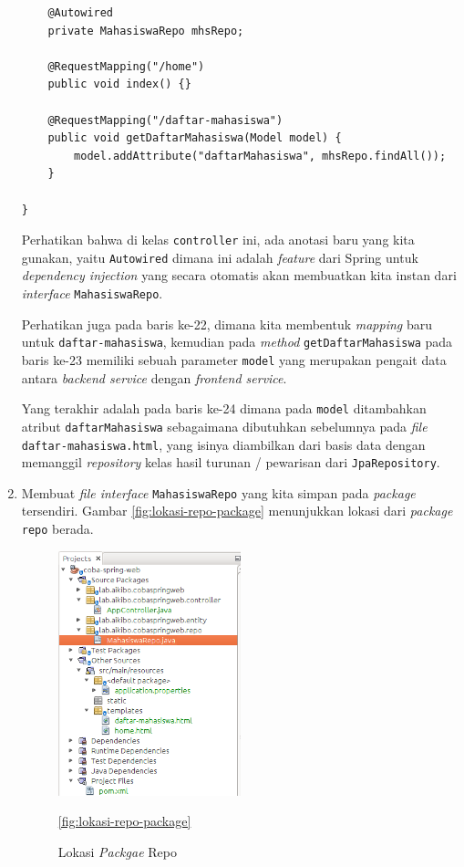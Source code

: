 \begin{enumerate}
\begin{lstlisting}
    @Autowired
    private MahasiswaRepo mhsRepo;
    
    @RequestMapping("/home")
    public void index() {}
    
    @RequestMapping("/daftar-mahasiswa") 
    public void getDaftarMahasiswa(Model model) {
        model.addAttribute("daftarMahasiswa", mhsRepo.findAll());
    }
    
}
	\end{lstlisting}
	
	Perhatikan bahwa di kelas \texttt{controller} ini, ada anotasi baru yang kita gunakan, yaitu \texttt{Autowired} dimana ini adalah \textit{feature} dari Spring untuk \textit{dependency injection} yang secara otomatis akan membuatkan kita instan dari \textit{interface} \texttt{MahasiswaRepo}.
	
	Perhatikan juga pada baris ke-22, dimana kita membentuk \textit{mapping} baru untuk \texttt{daftar-mahasiswa}, kemudian pada \textit{method} \texttt{getDaftarMahasiswa} pada baris ke-23 memiliki sebuah parameter \texttt{model} yang merupakan pengait data antara \textit{backend service} dengan \textit{frontend service}.
	
	Yang terakhir adalah pada baris ke-24 dimana pada \texttt{model} ditambahkan atribut \texttt{daftarMahasiswa} sebagaimana dibutuhkan sebelumnya pada \textit{file} \texttt{daftar-mahasiswa.html}, yang isinya diambilkan dari basis data dengan memanggil \textit{repository} kelas hasil turunan / pewarisan dari \texttt{JpaRepository}.
	
	\item Membuat \textit{file interface} \texttt{MahasiswaRepo} yang kita simpan pada \textit{package} tersendiri. Gambar \ref{fig:lokasi-repo-package} menunjukkan lokasi dari \textit{package} \texttt{repo} berada. 
	
	\begin{figure}[H]
		\centering
		\includegraphics[width=0.5\textwidth]{./resources/011-lokasi-mhs-repo}
		\caption{Lokasi \textit{Packgae} Repo}
		\ref{fig:lokasi-repo-package}
	\end{figure}
	

\end{enumerate}
